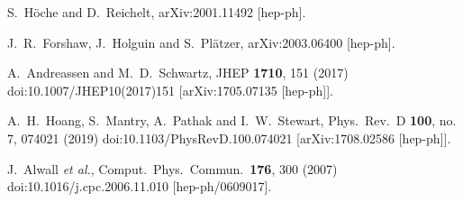 \documentclass[11pt,a4paper]{article}
\begin{document}
\begin{thebibliography}{99}
  S.~H\"oche and D.~Reichelt,
  arXiv:2001.11492 [hep-ph].


  J.~R.~Forshaw, J.~Holguin and S.~Pl\"atzer,
  arXiv:2003.06400 [hep-ph].


  A.~Andreassen and M.~D.~Schwartz,
  JHEP {\bf 1710}, 151 (2017)
  doi:10.1007/JHEP10(2017)151
  [arXiv:1705.07135 [hep-ph]].


  A.~H.~Hoang, S.~Mantry, A.~Pathak and I.~W.~Stewart,
  Phys.\ Rev.\ D {\bf 100}, no. 7, 074021 (2019)
  doi:10.1103/PhysRevD.100.074021
  [arXiv:1708.02586 [hep-ph]].


  J.~Alwall {\it et al.},
  Comput.\ Phys.\ Commun.\  {\bf 176}, 300 (2007)
  doi:10.1016/j.cpc.2006.11.010
  [hep-ph/0609017].

\end{thebibliography}
\end{document}
